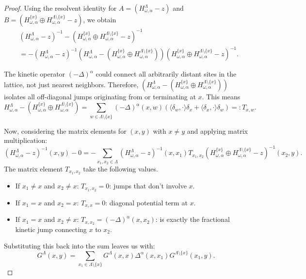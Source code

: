 \documentclass[11pt, a4paper, UKenglish, oneside]{book}
\theoremstyle{plain}
\theoremstyle{remark}
\theoremstyle{definition}
\numberwithin{equation}{section}
\numberwithin{theorem}{section}
\begin{document}
\begin{proof}
Using the resolvent identity for $A = (H_{\omega, \alpha}^\Lambda - z)$ and $B = (H_{\omega, \alpha}^{\{x\}} \oplus H_{\omega, \alpha}^{\Lambda \setminus \{x\}} - z)$, we obtain
\begin{align*}
&(H_{\omega, \alpha}^\Lambda - z)^{-1} - (H_{\omega, \alpha}^{\{x\}} \oplus H_{\omega, \alpha}^{\Lambda \setminus \{x\}} - z)^{-1} \\
&= - (H_{\omega, \alpha}^\Lambda - z)^{-1} \left( H_{\omega, \alpha}^\Lambda - (H_{\omega, \alpha}^{\{x\}} \oplus H_{\omega, \alpha}^{\Lambda \setminus \{x\}}) \right) 
(H_{\omega, \alpha}^{\{x\}} \oplus H_{\omega, \alpha}^{\Lambda \setminus \{x\}} - z)^{-1}.
\end{align*}

The kinetic operator $(-\Delta)^\alpha$ could connect all arbitrarily distant sites in the lattice, not just nearest neighbors. Therefore, $\left( H_{\omega, \alpha}^\Lambda - (H_{\omega, \alpha}^{\{x\}} \oplus H_{\omega, \alpha}^{\Lambda \setminus \{x\}}) \right)$ isolates all off-diagonal jumps originating from or terminating at $x$. This means
\[
H_{\omega, \alpha}^\Lambda - (H_{\omega, \alpha}^{\{x\}} \oplus H_{\omega, \alpha}^{\Lambda \setminus \{x\}}) = \sum_{w \in \Lambda \setminus \{x\}} (-\Delta)^\alpha(x, w) \left( \langle \delta_w, \cdot \rangle \delta_x + \langle \delta_x, \cdot \rangle \delta_w \right) =: T_{x,w}.
\]

Now, considering the matrix elements for $(x, y)$ with $x \neq y$ and applying matrix multiplication:
\[
 (H_{\omega, \alpha}^\Lambda - z)^{-1}(x,y) - 0 = -\sum_{x_1, x_2 \in \Lambda}(H_{\omega, \alpha}^\Lambda - z)^{-1} (x,x_1) T_{x_1, x_2} (H_{\omega, \alpha}^{\{x\}} \oplus H_{\omega, \alpha}^{\Lambda \setminus \{x\}} - z)^{-1}(x_2,y).
\]
The matrix element $T_{x_1, x_2}$ take the following values.
\begin{itemize}
    \item If $x_1 \neq x$ and $x_2 \neq x$: $T_{x_1, x_2} = 0$: jumps that don't involve $x$.
    \item If $x_1 = x$ and $x_2 = x$: $T_{x, x} = 0$: diagonal potential term at $x$.
    \item If $x_1 = x$ and $x_2 \neq x$: $T_{x, x_2} = (-\Delta)^\alpha(x, x_2)$: is exactly the fractional kinetic jump connecting $x$ to $x_2$.
\end{itemize}
Substituting this back into the sum leaves us with:
\[
G^\Lambda(x, y) = \sum_{x_1 \in \Lambda \setminus \{x\}} G^\Lambda(x, x) \Delta^\alpha(x, x_1) G^{\Lambda \setminus \{x\}}(x_1, y).
\]
\end{proof}
\end{document}
